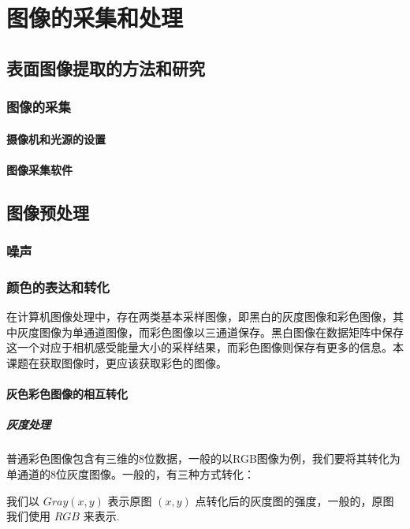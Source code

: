 \chapter{图像的采集和处理}
\section{表面图像提取的方法和研究}
\subsection{图像的采集}

\subsubsection{摄像机和光源的设置}
\subsubsection{图像采集软件}

\section{图像预处理}
\subsection{噪声}
\subsection{颜色的表达和转化}
在计算机图像处理中，存在两类基本采样图像，即黑白的灰度图像和彩色图像，其中灰度图像为单通道图像，而彩色图像以三通道保存。黑白图像在数据矩阵中保存这一个对应于相机感受能量大小的采样结果，而彩色图像则保存有更多的信息。本课题在获取图像时，更应该获取彩色的图像。
\subsubsection{灰色彩色图像的相互转化}
\paragraph{灰度处理}
普通彩色图像包含有三维的8位数据，一般的以RGB图像为例，我们要将其转化为单通道的8位灰度图像。一般的，有三种方式转化：

我们以 $ Gray(x,y) $ 表示原图 $ (x,y) $ 点转化后的灰度图的强度，一般的，原图我们使用 $ RGB $ 来表示.

